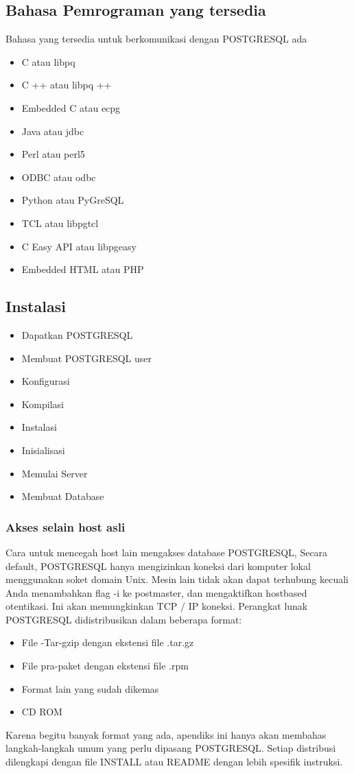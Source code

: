 \subsection {Bahasa Pemrograman yang tersedia}
Bahasa yang tersedia untuk berkomunikasi dengan POSTGRESQL ada
 \begin {itemize}
	\item C atau libpq
	\item C ++ atau libpq ++
	\item Embedded C atau ecpg
	\item Java atau jdbc
	\item Perl atau perl5
	\item ODBC atau odbc
	\item Python atau PyGreSQL
	\item TCL atau libpgtcl
	\item C Easy API atau libpgeasy
	\item Embedded HTML atau PHP
\end {itemize}

\subsection{Instalasi} 
\begin {itemize}
	\item Dapatkan POSTGRESQL
	\item Membuat POSTGRESQL user
	\item Konfigurasi
	\item Kompilasi
	\item Instalasi
	\item Inisialisasi
	\item Memulai Server
	\item Membuat Database
\end {itemize}

\subsubsection{Akses selain host asli}
Cara untuk mencegah host lain mengakses database POSTGRESQL, Secara default, POSTGRESQL hanya mengizinkan koneksi dari komputer lokal menggunakan soket domain Unix. Mesin lain tidak akan dapat terhubung kecuali Anda menambahkan flag -i ke postmaster, dan mengaktifkan hostbased otentikasi. Ini akan memungkinkan TCP / IP koneksi. Perangkat lunak POSTGRESQL didistribusikan dalam beberapa format:
\begin {itemize}
	\item File -Tar-gzip dengan ekstensi file .tar.gz
	\item File pra-paket dengan ekstensi file .rpm
	\item Format lain yang sudah dikemas
	\item CD ROM
\end {itemize}
Karena begitu banyak format yang ada, apendiks ini hanya akan membahas langkah-langkah umum yang perlu dipasang POSTGRESQL. Setiap distribusi dilengkapi dengan file INSTALL atau README dengan lebih spesifik instruksi.

